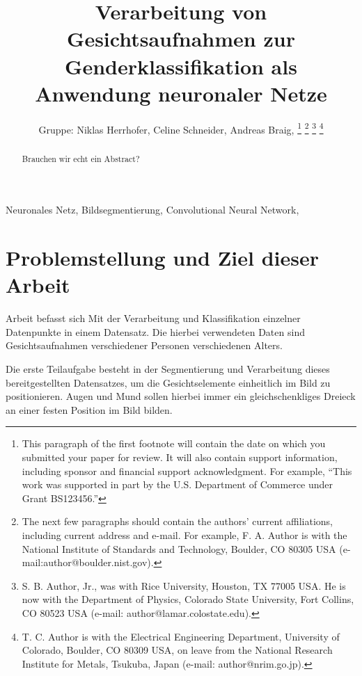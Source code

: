 \documentclass[journal,twoside,web]{ieeecolor}
\begin{document}
\title{Verarbeitung von Gesichtsaufnahmen zur Genderklassifikation als Anwendung neuronaler Netze}
\author{Gruppe: Niklas Herrhofer, Celine Schneider, Andreas Braig,
\thanks{This paragraph of the first footnote will contain the date on which
you submitted your paper for review. It will also contain support information,
including sponsor and financial support acknowledgment. For example, 
``This work was supported in part by the U.S. Department of Commerce under Grant BS123456.'' }
\thanks{The next few paragraphs should contain the authors' current affiliations,
including current address and e-mail. For example, F. A. Author is with the
National Institute of Standards and Technology, Boulder, CO 80305 USA (e-mail:author@boulder.nist.gov). }
\thanks{S. B. Author, Jr., was with Rice University, Houston, TX 77005 USA.
He is now with the Department of Physics, Colorado State University,
Fort Collins, CO 80523 USA (e-mail: author@lamar.colostate.edu).}
\thanks{T. C. Author is with the Electrical Engineering Department,
University of Colorado, Boulder, CO 80309 USA, on leave from the National
Research Institute for Metals, Tsukuba, Japan (e-mail: author@nrim.go.jp).}}

\maketitle

\begin{abstract}
    Brauchen wir echt ein Abstract? 
\end{abstract}


\begin{IEEEkeywords}
    Neuronales Netz, Bildsegmentierung, Convolutional Neural Network, 
\end{IEEEkeywords}

\section{Problemstellung und Ziel dieser Arbeit}
\label{sec:introduction}
 Arbeit befasst sich Mit der Verarbeitung und Klassifikation einzelner Datenpunkte in einem Datensatz.
Die hierbei verwendeten Daten sind Gesichtsaufnahmen verschiedener Personen verschiedenen Alters. 

Die erste Teilaufgabe besteht in der Segmentierung und Verarbeitung dieses bereitgestellten Datensatzes, um die Gesichtselemente einheitlich im Bild zu positionieren. 
Augen und Mund sollen hierbei immer ein gleichschenkliges Dreieck an einer festen Position im Bild bilden. 
\end{document}
